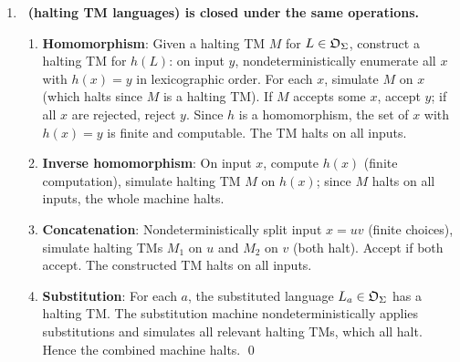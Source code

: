 \begin{enumerate}[{11.}1. ]
\item \textbf{\OSIG\ (halting TM languages) is closed under the same operations.}

\begin{enumerate}
\item \textbf{Homomorphism}: Given a halting TM $M$ for $L\in\mathfrak{O}_\Sigma$, construct a halting TM for $h(L)$: on input $y$, nondeterministically enumerate all $x$ with $h(x)=y$ in lexicographic order. For each $x$, simulate $M$ on $x$ (which halts since $M$ is a halting TM). If $M$ accepts some $x$, accept $y$; if all $x$ are rejected, reject $y$. Since $h$ is a homomorphism, the set of $x$ with $h(x)=y$ is finite and computable. The TM halts on all inputs.

\item \textbf{Inverse homomorphism}: On input $x$, compute $h(x)$ (finite computation), simulate halting TM $M$ on $h(x)$; since $M$ halts on all inputs, the whole machine halts.

\item \textbf{Concatenation}: Nondeterministically split input $x=uv$ (finite choices), simulate halting TMs $M_1$ on $u$ and $M_2$ on $v$ (both halt). Accept if both accept. The constructed TM halts on all inputs.

\item \textbf{Substitution}: For each $a$, the substituted language $L_a\in\mathfrak{O}_\Sigma$ has a halting TM. The substitution machine nondeterministically applies substitutions and simulates all relevant halting TMs, which all halt. Hence the combined machine halts. \qed
\end{enumerate}

\end{enumerate}
